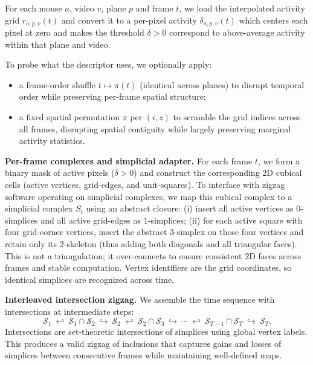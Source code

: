 \documentclass[11pt]{article}
\begin{document}
For each mouse $a$, video $v$, plane $p$ and frame $t$, we load the interpolated activity grid $r_{a,p,v}(t)$ and convert it to a per-pixel activity
$\delta_{a,p,v}(t)$ which centers each pixel at zero and makes the threshold $\delta > 0$ correspond to above-average activity within that plane and video.

To probe what the descriptor uses, we optionally apply:
\begin{itemize}
\item a frame-order shuffle $t \mapsto \pi(t)$ (identical across planes) to disrupt temporal order while preserving per-frame spatial structure;
\item a fixed spatial permutation $\pi$ per $(i,z)$ to scramble the grid indices across all frames, disrupting spatial contiguity while largely preserving marginal activity statistics.
\end{itemize}

\noindent\textbf{Per-frame complexes and simplicial adapter.}
For each frame $t$, we form a binary mask of active pixels ($\delta > 0$) and construct the corresponding 2D cubical cells (active vertices, grid-edges, and unit-squares). To interface with zigzag software operating on simplicial complexes, we map this cubical complex to a simplicial complex $S_t$ using an abstract closure:
(i) insert all active vertices as 0-simplices and all active grid-edges as 1-simplices; (ii) for each active square with four grid-corner vertices, insert the abstract 3-simplex on those four vertices and retain only its 2-skeleton (thus adding both diagonals and all triangular faces). This is not a triangulation; it over-connects to ensure consistent 2D faces across frames and stable computation. Vertex identifiers are the grid coordinates, so identical simplices are recognized across time.

\noindent\textbf{Interleaved intersection zigzag.}
We assemble the time sequence with intersections at intermediate steps:
\begin{equation}
\mathcal{S}_1 \ \hookleftarrow\ \mathcal{S}_1 \cap \mathcal{S}_2\ \hookrightarrow\ \mathcal{S}_2 \ \hookleftarrow\ \mathcal{S}_2 \cap \mathcal{S}_3\ \hookrightarrow\ \cdots \ \hookleftarrow\ \mathcal{S}_{T-1}\cap \mathcal{S}_T\ \hookrightarrow\ \mathcal{S}_T.
\end{equation}
Intersections are set-theoretic intersections of simplices using global vertex labels. This produces a valid zigzag of inclusions that captures gains and losses of simplices between consecutive frames while maintaining well-defined maps.
\end{document}
